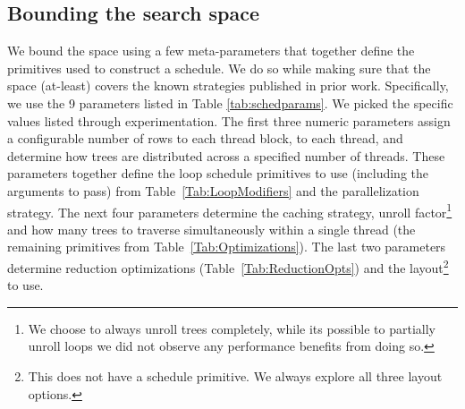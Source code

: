 \subsection{Bounding the search space}
We bound the space using a few meta-parameters that together define 
the primitives used to construct a schedule. We do so while making sure 
that the space (at-least) covers the known strategies published in prior work.
Specifically, we use the 9 parameters listed in Table \ref{tab:schedparams}.
We picked the specific values listed through experimentation.
The first three numeric parameters assign a configurable number of rows to each 
thread block, to each thread, and determine how trees are distributed across a
specified number of threads. These parameters together define the loop schedule 
primitives to use (including the arguments to pass) from Table~\ref{Tab:LoopModifiers} 
and the parallelization strategy. The next four parameters determine the caching strategy, 
unroll factor{\footnote{We choose to always unroll trees completely, while its possible 
to partially unroll loops we did not observe any performance benefits from doing so.}} 
and how many trees to traverse simultaneously within
a single thread (the remaining primitives from Table~\ref{Tab:Optimizations}).  
The last two parameters determine reduction optimizations (Table~\ref{Tab:ReductionOpts}) 
and the layout{\footnote{This does not have a schedule primitive. We always explore all three layout options.}} to use.

